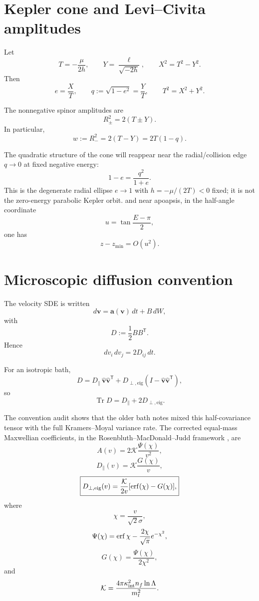 \documentclass[11pt]{article}
\theoremstyle{remark}
\newcommand{\1}{\mathbf 1}
\begin{document}
\section{Kepler cone and Levi--Civita amplitudes}

Let
\[
T=-\frac{\mu}{2h},
\qquad
Y=\frac{\ell}{\sqrt{-2h}},
\qquad
X^2=T^2-Y^2.
\]
Then
\[
e=\frac XT,
\qquad
q:=\sqrt{1-e^2}=\frac YT,
\qquad
T^2=X^2+Y^2.
\]

The nonnegative spinor amplitudes are
\[
\boxed{
R_\pm^2=2(T\pm Y).
}
\]
In particular,
\[
w:=R_-^2=2(T-Y)=2T(1-q).
\]

The quadratic structure of the cone will reappear near the
radial/collision edge $q\to0$ at fixed negative energy:
\[
1-e=\frac{q^2}{1+e}.
\]
This is the degenerate radial ellipse $e\to1$ with
$h=-\mu/(2T)<0$ fixed; it is not the zero-energy parabolic Kepler orbit.
and near apoapsis, in the half-angle coordinate
\[
u=\tan\frac{E-\pi}{2},
\]
one has
\[
z-z_{\min}=O(u^2).
\]

\section{Microscopic diffusion convention}

The velocity SDE is written
\[
d\bm v=\bm a(\bm v)\,dt+B\,dW,
\]
with
\[
\boxed{
D:=\frac12BB^{\mathsf T}.
}
\]
Hence
\[
d v_i\,d v_j=2D_{ij}\,dt.
\]

For an isotropic bath,
\[
D
=
D_\parallel\,\hat{\bm v}\hat{\bm v}^{\mathsf T}
+
D_{\perp,\mathrm{eig}}
(I-\hat{\bm v}\hat{\bm v}^{\mathsf T}),
\]
so
\[
\operatorname{Tr}D
=
D_\parallel+2D_{\perp,\mathrm{eig}}.
\]

The convention audit shows that the older bath notes mixed this half-covariance
tensor with the full Kramers--Moyal variance rate.  The corrected equal-mass
Maxwellian coefficients, in the Rosenbluth--MacDonald--Judd framework
\cite{Rosenbluth1957}, are
\begin{equation}
\boxed{
A(v)
=
2\mathcal K\frac{\Psi(\chi)}{v^2},
}
\end{equation}
\begin{equation}
\boxed{
D_\parallel(v)
=
\mathcal K\frac{G(\chi)}{v},
}
\end{equation}
\begin{equation}
\boxed{
D_{\perp,\mathrm{eig}}(v)
=
\frac{\mathcal K}{2v}
[\erf(\chi)-G(\chi)],
}
\end{equation}
where
\[
\chi=\frac{v}{\sqrt2\sigma},
\]
\[
\Psi(\chi)
=
\erf\chi-\frac{2\chi}{\sqrt\pi}e^{-\chi^2},
\]
\[
G(\chi)
=
\frac{\Psi(\chi)}{2\chi^2},
\]
and
\[
\mathcal K
=
\frac{4\pi\kappa_{\rm int}^2n_f\ln\Lambda}{m_t^2}.
\]
\end{document}
